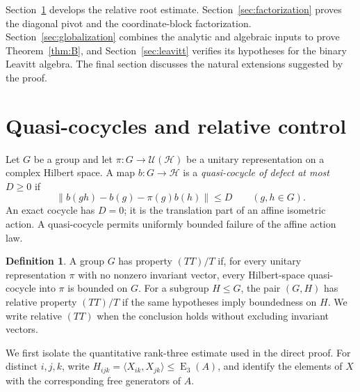 \documentclass[11pt]{amsart}
\theoremstyle{definition}
\newtheorem{definition}[theorem]{Definition}
\theoremstyle{plain}
\newcommand{\EL}{\operatorname{E}}
\newcommand{\norm}[1]{\left\lVert#1\right\rVert}
\begin{document}
Section~\ref{sec:quasicocycles} develops the relative root estimate.
Section~\ref{sec:factorization} proves the diagonal pivot and the
coordinate-block factorization.  Section~\ref{sec:globalization}
combines the analytic and algebraic inputs to prove
Theorem~\ref{thm:B}, and Section~\ref{sec:leavitt} verifies its
hypotheses for the binary Leavitt algebra.  The final section
discusses the natural extensions suggested by the proof.

\section{Quasi-cocycles and relative control}\label{sec:quasicocycles}

Let \(G\) be a group and let
\(\pi:G\to\mathcal U(\mathcal H)\) be a unitary representation on a
complex Hilbert space.  A map \(b:G\to\mathcal H\) is a
\emph{quasi-cocycle of defect at most \(D\ge0\)} if
\begin{equation}\label{eq:quasicocycle}
  \norm{b(gh)-b(g)-\pi(g)b(h)}\le D
  \qquad(g,h\in G).
\end{equation}
An exact cocycle has \(D=0\); it is the translation part of an
affine isometric action.  A quasi-cocycle permits uniformly bounded
failure of the affine action law.

\begin{definition}\label{def:tt}
A group \(G\) has property \((TT)/T\) if, for every unitary
representation \(\pi\) with no nonzero invariant vector, every
Hilbert-space quasi-cocycle into \(\pi\) is bounded on \(G\).
For a subgroup \(H\le G\), the pair \((G,H)\) has relative property
\((TT)/T\) if the same hypotheses imply boundedness on \(H\).  We
write relative \((TT)\) when the conclusion holds without excluding
invariant vectors.
\end{definition}

We first isolate the quantitative rank-three estimate used in the
direct proof.  For distinct \(i,j,k\), write
\(H_{ijk}=\langle X_{ik},X_{jk}\rangle\le\EL_3(A)\), and identify
the elements of \(X\) with the corresponding free generators of
\(A\).
\end{document}
